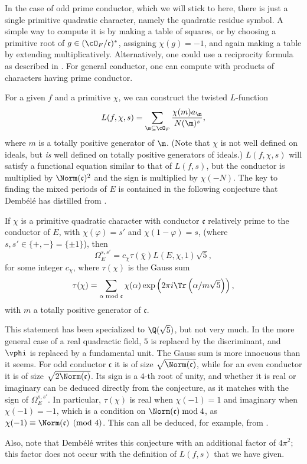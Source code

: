 \documentclass{amsart}
\newcommand{\fc}{\mathfrak{c}}
\newcommand{\OF}{\cO_F}
\newcommand{\dembele}{Demb\'el{\'e}\xspace}
\begin{document}
In the case of odd prime conductor, which we will stick to here, there is
just a single primitive quadratic character, namely the quadratic residue symbol.
A simple way to compute it is by making a
table of squares, or by choosing a primitive root of $g \in (\OF/\fc)^*$, assigning
$\chi(g) = -1$, and again making a table by extending multiplicatively. Alternatively,
one could use a reciprocity formula as described in \cite{boylan-skoruppa:hecke-gauss-sums}.
For general conductor, one can compute with products of characters having prime conductor.

For a given $f$ and a primitive $\chi$, we can construct the twisted $L$-function
\[
    L(f, \chi, s) = \sum_{\m \subseteq \OF} \frac{\chi(m)a{_{\m}}}{N(\m)^s},
\]
where $m$ is a totally positive generator of $\m$. (Note that $\chi$ is not well defined
on ideals, but {\em is} well defined on totally positive generators of ideals.) $L(f, \chi, s)$
will satisfy a functional equation similar to that of $L(f, s)$, but the conductor is
multiplied by $\Norm(\fc)^2$ and the sign is multiplied by $\chi(-N)$. The key to finding the
mixed periods of $E$ is contained in the following conjecture that \dembele has distilled
from \cite{bertolini-darmon-green}.
\begin{conjecture}
If $\chi$ is a primitive quadratic character with conductor $\fc$ relatively prime to the
conductor of $E$, with $\chi(\varphi) = s'$ and
$\chi(1 - \varphi) = s$, (where $s, s' \in \{+, -\} = \{\pm1\}$), then
\[
    \Omega^{s,s'}_E = c_\chi \tau(\overline\chi) L(E, \chi, 1)\sqrt5,
\]
for some integer $c_\chi$, where $\tau(\chi)$ is the Gauss sum
\[
    \tau(\chi) = \sum_{\alpha \bmod \fc} \chi(\alpha) \exp\left(2 \pi i \Tr\left(\alpha/m\sqrt{5}\right) \right),
\]
with $m$ a totally positive generator of $\fc$.
\end{conjecture}
\begin{remark}
  This statement has been specialized to $\Q(\sqrt 5)$, but not very
  much. In the more general case of a real quadractic field, $5$ is
  replaced by the discriminant, and $\vphi$ is replaced by a
  fundamental unit.  The Gauss sum is more innocuous than it
  seems. For odd conductor $\fc$ it is of size $\sqrt{\Norm(\fc)}$, while
  for an even conductor it is of size $\sqrt{2 \Norm(\fc) }$.  Its sign is
  a $4$-th root of unity, and whether it is real or imaginary can be
  deduced directly from the conjecture, as it matches with the sign of
  $\Omega^{s,s'}_E$. In particular, $\tau(\chi)$ is real when
  $\chi(-1) = 1$ and imaginary when $\chi(-1) = -1$, which is a
  condition on $\Norm(\fc) \bmod 4$, as $\chi(-1) \equiv \Norm(\fc) \pmod
  4$. This can all be deduced, for example, from
  \cite{boylan-skoruppa:hecke-gauss-sums}.

Also, note that \dembele writes this conjecture with an additional factor of $4\pi^2$;
this factor does not occur with the definition of $L(f, s)$ that we have given.

\end{remark}
\end{document}

